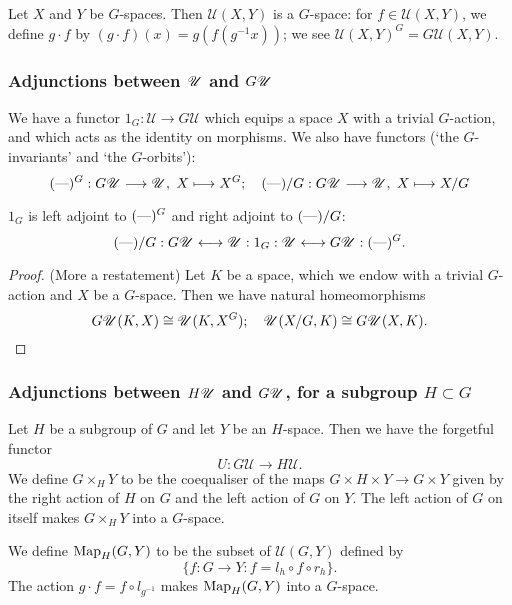 \documentclass[11pt]{article}
\newcommand{\bluenote}[1]{{\color{blue}#1}\scalebox{.1}{rednote}}
\begin{document}
Let $X$ and $Y$ be $G$-spaces. Then $\mathscr{U}(X,Y)$ is a $G$-space: for $f\in\mathscr{U}(X,Y)$, we define $g\cdot f$ by  $(g\cdot f)(x)=g(f(g^{-1}x))$; we see $\mathscr{U}(X,Y)^G=G\mathscr{U}(X,Y)$.
\subsubsection*{Adjunctions between $\mathscr{U}$ and $G\mathscr{U}$}
We have a functor $1_G:\mathscr{U}\to G\mathscr{U}$ which equips a space $X$ with a trivial $G$-action, and which acts as the identity on morphisms.
We also have functors (`the $G$-invariants' and `the $G$-orbits'):
\[(\textup{---})^G:G\mathscr{U}\longrightarrow\mathscr{U}, \hspace{3pt} X\longmapsto X^G; \hspace{10pt}
(\textup{---})/G:G\mathscr{U}\longrightarrow\mathscr{U}, \hspace{3pt} X\longmapsto X/G\]
\begin{thm*} $1_G$ is left adjoint to $(\textup{---})^G$ and right adjoint to $(\textup{---})/G$:
\[(\textup{---})/G:G\mathscr{U}\longleftrightarrow\mathscr{U}: 1_G:\mathscr{U}\longleftrightarrow G\mathscr{U}: (\textup{---})^G.\]
\end{thm*}
\begin{proof} \bluenote{(More a restatement)} Let $K$ be a space, which we endow with a trivial $G$-action and $X$ be a $G$-space. Then we have natural homeomorphisms
\[G\mathscr{U}(K,X)\cong\mathscr{U}(K,X^G);\hspace{10pt}
\mathscr{U}(X/G,K)\cong G\mathscr{U}(X,K).\qedhere\]
\end{proof}
\subsubsection*{Adjunctions between $H\mathscr{U}$ and $G\mathscr{U}$, for a subgroup $H\subset G$}
Let $H$ be a subgroup of $G$ and let $Y$ be an $H$-space. Then we have the forgetful functor
\[U:G\mathscr{U}\to H\mathscr{U}.\]
We define $G\times_H Y$ to be the coequaliser of the maps $G\times H\times Y\to G\times Y$ given by the right action of $H$ on $G$ and the left action of $G$ on $Y$. The left action of $G$ on itself makes $G\times_H Y$ into a $G$-space.

We define $\textup{Map}_H(G,Y)$ to be the subset of $\mathscr{U}(G,Y)$ defined by
\[\{f:G\to Y: f=l_h\circ f\circ r_h\}.\]
The action $g\cdot f=f\circ l_{g^{-1}}$ makes $\textup{Map}_H(G,Y)$ into a $G$-space.
\end{document}
